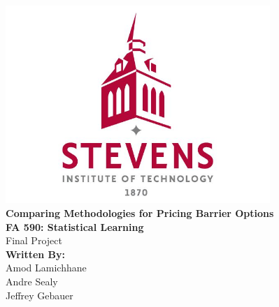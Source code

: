 %

\begin{titlepage}
    \centering
\vspace*{1cm}
{ \includegraphics[width=10cm]{images (2).png}}\\[1cm]

{\LARGE \textbf{Comparing Methodologies for Pricing Barrier Options}}\\[1cm]

\textbf{FA 590: Statistical Learning}\\
Final Project\\[0.5cm]

\textbf{Written By:}{}\\
Amod Lamichhane \\[0.5cm]
Andre Sealy \\[0.5cm]
Jeffrey Gebauer \\[0.5cm]
\date{\large Date Last Edited: \today}
\end{titlepage}
